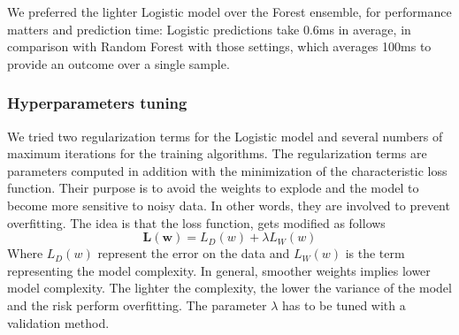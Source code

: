 We preferred the lighter Logistic model over the Forest ensemble, for performance matters and prediction time: Logistic predictions take 0.6ms in average, in comparison with Random Forest with those settings, which averages 100ms to provide an outcome over a single sample.

\subsubsection{Hyperparameters tuning}
We tried two regularization terms for the Logistic model and several numbers of maximum iterations for the training algorithms.
The regularization terms are parameters computed in addition with the minimization of the characteristic loss function. Their purpose is to avoid the weights to explode and the model to become more sensitive to noisy data. In other words, they are involved to prevent overfitting.
The idea is that the loss function, gets modified as follows
\[ \mathbf{L(w)} = L_{D}(w) + \lambda L_{W}(w)\]
Where $ L_{D}(w)  $ represent the error on the data and $ L_{W}(w)  $ is the term representing the model complexity. In general, smoother weights implies lower model complexity. The lighter the complexity, the lower the variance of the model and the risk perform overfitting.
The parameter $ \mathit{\lambda} $ has to be tuned with a validation method.

